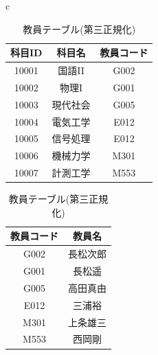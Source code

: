 \documentclass[a4j]{jarticle}
\begin{document}
            \begin{table}[H]
              \begin{center}
                \begin{tabular}{c}

                  \begin{minipage}{0.5\hsize}
              \caption{科目テーブル(第三正規化)}
              \label{one3E}
              \begin{center}
                \begin{tabular}{c|c|c}\hline
                  科目ID & 科目名 & 教員コード \\ \hline  \hline
                  10001 & 国語II & G002 \\ \hline
                  10002 & 物理I & G001 \\ \hline
                  10003 & 現代社会 & G005 \\ \hline
                  10004 & 電気工学 & E012 \\ \hline
                  10005 & 信号処理 & E012 \\ \hline
                  10006 & 機械力学 & M301 \\ \hline
                  10007 & 計測工学 & M553 \\ \hline
                \end{tabular}
              \end{center}
            \end{minipage}

            \begin{minipage}{0.5\hsize}
                \caption{教員テーブル(第三正規化)}
                \label{one3F}
                \begin{center}
                  \begin{tabular}{c|c}\hline
                    教員コード & 教員名 \\ \hline \hline
                    G002 & 長松次郎 \\ \hline
                    G001 & 長松遥 \\ \hline
                    G005 & 高田真由 \\ \hline
                    E012 & 三浦裕 \\ \hline
                    M301 & 上条雄三 \\ \hline
                    M553 & 西岡剛 \\ \hline
                  \end{tabular}
                \end{center}
              \end{minipage}
            \end{tabular}
          \end{center}
                \end{table}
\end{document}
